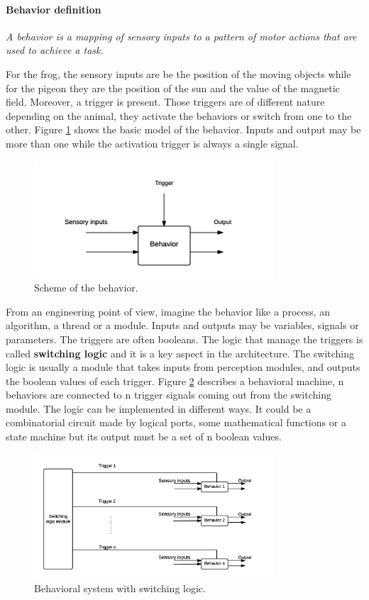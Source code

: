 \paragraph{Behavior definition} \textit{A behavior is a mapping of sensory inputs to a pattern of motor actions that are used to achieve a task.} \newline

\noindent
For the frog, the sensory inputs are be the position of the moving objects while for the pigeon they are the position of the sun and the value of the magnetic field. Moreover, a trigger is present. Those triggers are of different nature depending on the animal, they activate the behaviors or switch from one to the other. Figure \ref{figure:behavior} shows the basic model of the behavior. Inputs and output may be more than one while the activation trigger is always a single signal. 
\begin{figure}[h]
\centering
 \includegraphics[width=0.8\textwidth]{behavior.png}
 \caption[Behavior definition]{Scheme of the behavior.}
 \label{figure:behavior}
\end{figure}
From an engineering point of view, imagine the behavior like a process, an algorithm, a thread or a module. Inputs and outputs may be variables, signals or parameters. The triggers are often booleans. The logic that manage the triggers is called \textbf{switching logic} and it is a key aspect in the architecture. The switching logic is usually a module that takes inputs from perception modules, and outputs the boolean values of each trigger. Figure \ref{figure:switch} describes a behavioral machine, n behaviors are connected to n trigger signals coming out from the switching module. The logic can be implemented in different ways. It could be a combinatorial circuit made by logical ports, some mathematical functions or a state machine but its output must be a set of n boolean values. 
\begin{figure}[h]
\centering
 \includegraphics[width=0.8\textwidth]{switch.png}
 \caption[Switching logic]{Behavioral system with switching logic.}
 \label{figure:switch}
\end{figure}

